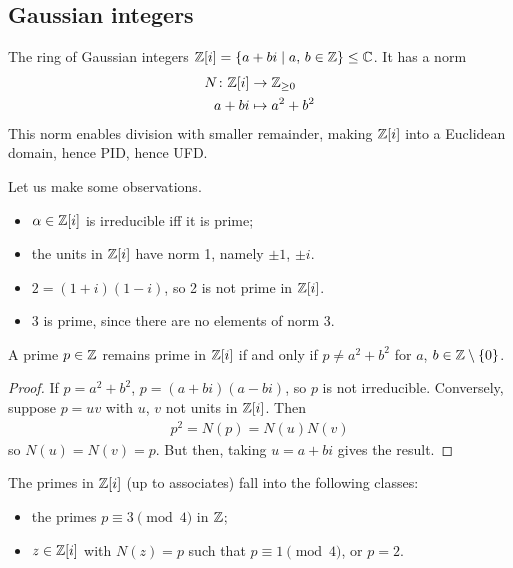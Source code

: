 \documentclass{../template/note}
\begin{document}
    \subsection{Gaussian integers}

    The ring of Gaussian integers $\mathbb Z[i] = \{a + bi \mid a,\, b \in \mathbb Z\} \leq \mathbb C$. It has a norm
    \begin{align*}
        N\colon \mathbb Z[i] &\to \mathbb Z_{\geq 0} \\
        a + bi &\mapsto a^2+b^2
    \end{align*}
    This norm enables division with smaller remainder, making $\mathbb Z[i]$ into a Euclidean domain, hence PID, hence UFD.

    \begin{remark*}
        Let us make some observations.
        \begin{itemize}
            \item $\alpha \in \mathbb Z[i]$ is irreducible iff it is prime;
            \item the units in $\mathbb Z[i]$ have norm 1, namely $\pm 1$, $\pm i$.
            \item $2 = (1+i)(1-i)$, so 2 is not prime in $\mathbb Z[i]$.
            \item 3 is prime, since there are no elements of norm 3.
        \end{itemize}
    \end{remark*}
    
    \begin{proposition}
        A prime $p \in \mathbb Z$ remains prime in $\mathbb Z[i]$ if and only if $p \neq a^2 + b^2$ for $a$, $b \in \mathbb Z \setminus \{0\}$.
    \end{proposition}
    
    \begin{proof}
        If $p = a^2 + b^2$, $p=(a+bi)(a-bi)$, so $p$ is not irreducible. Conversely, suppose $p = uv$ with $u$, $v$ not units in $\mathbb Z[i]$. Then
        \begin{align*}
            p^2 = N(p) = N(u)N(v)
        \end{align*}
        so $N(u) = N(v) = p$. But then, taking $u=a+bi$ gives the result.        
    \end{proof}
    
    \begin{theorem}
        The primes in $\mathbb Z[i]$ (up to associates) fall into the following classes:
        \begin{itemize}
            \item the primes $p \equiv 3 \pmod 4$ in $\mathbb Z$;
            \item $z \in \mathbb Z[i]$ with $N(z) = p$ such that $p \equiv 1 \pmod 4$, or $p=2$.
        \end{itemize}
    \end{theorem}
    
\end{document}
